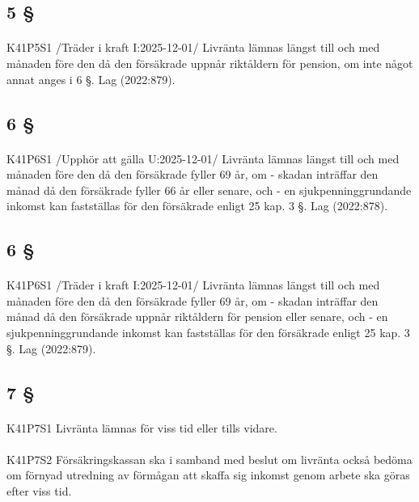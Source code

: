 \documentclass[a4paper,notitlepage,openany,10pt]{book}
\begin{document}
\subsection*{5 §}
\paragraph*{}
{\tiny K41P5S1}
/Träder i kraft I:2025-12-01/
Livränta lämnas längst till och med månaden före den då den försäkrade uppnår riktåldern för pension, om inte något annat anges i 6 §.
Lag (2022:879).
\subsection*{6 §}
\paragraph*{}
{\tiny K41P6S1}
/Upphör att gälla U:2025-12-01/
Livränta lämnas längst till och med månaden före den då den försäkrade fyller 69 år, om
\newline - skadan inträffar den månad då den försäkrade fyller 66 år eller senare, och
\newline - en sjukpenninggrundande inkomst kan fastställas för den försäkrade enligt 25 kap. 3 §.
Lag (2022:878).
\subsection*{6 §}
\paragraph*{}
{\tiny K41P6S1}
/Träder i kraft I:2025-12-01/
Livränta lämnas längst till och med månaden före den då den försäkrade fyller 69 år, om
\newline - skadan inträffar den månad då den försäkrade uppnår riktåldern för pension eller senare, och
\newline - en sjukpenninggrundande inkomst kan fastställas för den försäkrade enligt 25 kap. 3 §.
Lag (2022:879).
\subsection*{7 §}
\paragraph*{}
{\tiny K41P7S1}
Livränta lämnas för viss tid eller tills vidare.
\paragraph*{}
{\tiny K41P7S2}
Försäkringskassan ska i samband med beslut om livränta också bedöma om förnyad utredning av förmågan att skaffa sig inkomst genom arbete ska göras efter viss tid.
\end{document}
